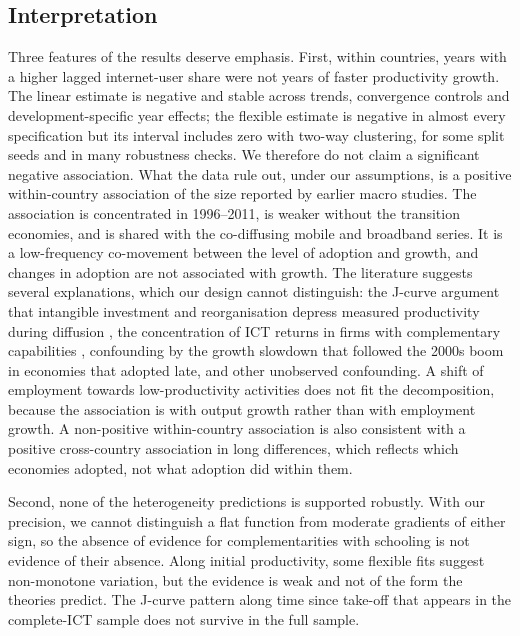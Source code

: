 \documentclass[preprint,12pt,authoryear]{elsarticle}
\begin{document}
\subsection{Interpretation}

Three features of the results deserve emphasis. First, within countries, years with a higher lagged internet-user share were not years of faster productivity growth. The linear estimate is negative and stable across trends, convergence controls and development-specific year effects; the flexible estimate is negative in almost every specification but its interval includes zero with two-way clustering, for some split seeds and in many robustness checks. We therefore do not claim a significant negative association. What the data rule out, under our assumptions, is a positive within-country association of the size reported by earlier macro studies. The association is concentrated in 1996--2011, is weaker without the transition economies, and is shared with the co-diffusing mobile and broadband series. It is a low-frequency co-movement between the level of adoption and growth, and changes in adoption are not associated with growth. The literature suggests several explanations, which our design cannot distinguish: the J-curve argument that intangible investment and reorganisation depress measured productivity during diffusion \citep{brynjolfsson2021jcurve}, the concentration of ICT returns in firms with complementary capabilities \citep{gal2019digitalisation,nicoletti2020diffusion}, confounding by the growth slowdown that followed the 2000s boom in economies that adopted late, and other unobserved confounding. A shift of employment towards low-productivity activities does not fit the decomposition, because the association is with output growth rather than with employment growth. A non-positive within-country association is also consistent with a positive cross-country association in long differences, which reflects which economies adopted, not what adoption did within them.

Second, none of the heterogeneity predictions is supported robustly. With our precision, we cannot distinguish a flat function from moderate gradients of either sign, so the absence of evidence for complementarities with schooling is not evidence of their absence. Along initial productivity, some flexible fits suggest non-monotone variation, but the evidence is weak and not of the form the theories predict. The J-curve pattern along time since take-off that appears in the complete-ICT sample does not survive in the full sample.
\end{document}
